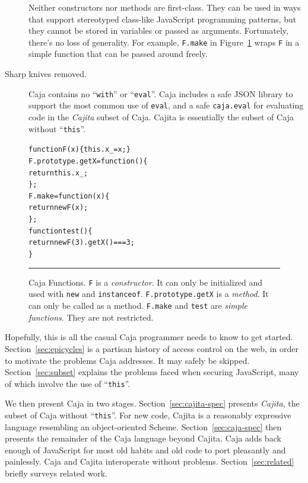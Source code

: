 \documentclass[letterpaper,twocolumn,10pt]{article}
\newcommand{\code}[1]{{\tt {#1}}}              %
\begin{document}
\begin{description}
  Neither constructors nor methods are first-class. They can be used in ways 
  that support stereotyped class-like JavaScript programming patterns, but 
  they cannot be stored in variables or passed as arguments. Fortunately, 
  there's no loss of generality. For example, \code{F.make} in 
  Figure~\ref{fig:func-obj} wraps \code{F} in a simple function that can be 
  passed around freely.
 
  \item[Sharp knives removed.] Caja contains no ``\code{with}'' or 
  ``\code{eval}''. Caja includes a safe JSON library to support the most 
  common use of \code{eval}, and a safe \code{caja.eval} for evaluating code 
  in the \emph{Cajita} subset of Caja. Cajita is essentially the subset of
  Caja without ``\code{this}''. 
 
\end{description}

\begin{figure}[t!]
\begin{alltt}
function F(x) \{ this.x_ = x; \}
F.prototype.getX = function() \{
  return this.x_;
\};
F.make = function(x) \{
  return new F(x);
\};
function test() \{
  return new F(3).getX() === 3;
\}
\end{alltt}

\caption[Caja Functions]{Caja Functions. \code{F} is a \emph{constructor}. It 
can only be initialized and used with \code{new} and \code{instanceof}. 
\code{F.prototype.getX} is a \emph{method}. It can only be called as a 
method. \code{F.make} and \code{test} are \emph{simple functions}. They are
not restricted. \\ } \hrule
\label{fig:func-obj}
\end{figure}

Hopefully, this is all the casual Caja programmer needs to know to get 
started. Section~\ref{sec:epicycles} is a partisan history of access control 
on the web, in order to motivate the problems Caja addresses. It may safely 
be skipped. Section~\ref{sec:subset} explains the problems faced when 
securing JavaScript, many of which involve the use of ``\code{this}''.

We then present Caja in two stages. Section~\ref{sec:cajita-spec} presents 
\emph{Cajita}, the subset of Caja without ``\code{this}''. For new code, 
Cajita is a reasonably expressive language resembling an object-oriented 
Scheme. Section~\ref{sec:caja-spec} then presents the remainder of the Caja 
language beyond Cajita. Caja adds back enough of JavaScript for most old 
habits and old code to port pleasantly and painlessly. Caja and Cajita 
interoperate without problems. Section~\ref{sec:related} briefly 
surveys related work.
\end{document}
